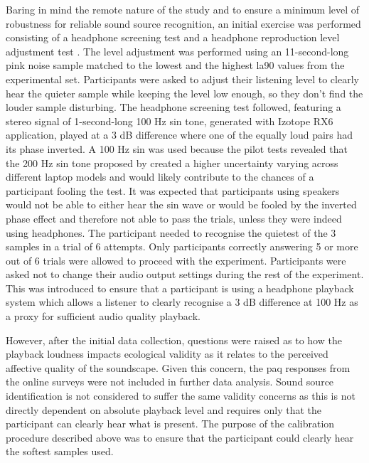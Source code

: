    Baring in mind the remote nature of the study and to ensure a minimum level of robustness for reliable sound source recognition, an initial exercise was performed consisting of a headphone screening test \citep{Woods2017Headphone} and a headphone reproduction level adjustment test \citep{Gontier2019Estimation}. The level adjustment was performed using an 11-second-long pink noise sample matched to the lowest and the highest \gls{la90} values from the experimental set. Participants were asked to adjust their listening level to clearly hear the quieter sample while keeping the level low enough, so they don't find the louder sample disturbing. The headphone screening test followed, featuring a stereo signal of 1-second-long 100 Hz sin tone, generated with Izotope RX6 application, played at a 3 dB difference where one of the equally loud pairs had its phase inverted. A 100 Hz sin was used because the pilot tests revealed that the 200 Hz sin tone proposed by \citet{Woods2017Headphone} created a higher uncertainty varying across different laptop models and would likely contribute to the chances of a participant fooling the test. It was expected that participants using speakers would not be able to either hear the sin wave or would be fooled by the inverted phase effect and therefore not able to pass the trials, unless they were indeed using headphones. The participant needed to recognise the quietest of the 3 samples in a trial of 6 attempts. Only participants correctly answering 5 or more out of 6 trials were allowed to proceed with the experiment. Participants were asked not to change their audio output settings during the rest of the experiment. This was introduced to ensure that a participant is using a headphone playback system which allows a listener to clearly recognise a 3 dB difference at 100 Hz as a proxy for sufficient audio quality playback.

   However, after the initial data collection, questions were raised as to how the playback loudness impacts ecological validity as it relates to the perceived affective quality of the soundscape. Given this concern, the \gls{paq} responses from the online surveys were not included in further data analysis. Sound source identification is not considered to suffer the same validity concerns as this is not directly dependent on absolute playback level and requires only that the participant can clearly hear what is present. The purpose of the calibration procedure described above was to ensure that the participant could clearly hear the softest samples used.

